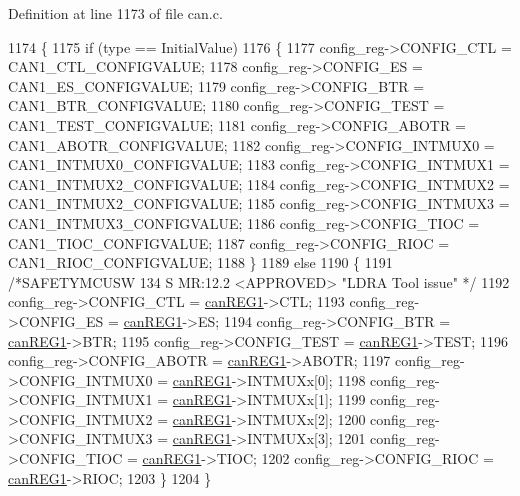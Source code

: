 Definition at line 1173 of file can.\+c.


\begin{DoxyCode}
1174 \{
1175     \textcolor{keywordflow}{if} (type == InitialValue)
1176     \{
1177         config\_reg->CONFIG\_CTL     = CAN1\_CTL\_CONFIGVALUE;    
1178         config\_reg->CONFIG\_ES      = CAN1\_ES\_CONFIGVALUE;     
1179         config\_reg->CONFIG\_BTR     = CAN1\_BTR\_CONFIGVALUE;    
1180         config\_reg->CONFIG\_TEST    = CAN1\_TEST\_CONFIGVALUE;   
1181         config\_reg->CONFIG\_ABOTR   = CAN1\_ABOTR\_CONFIGVALUE;  
1182         config\_reg->CONFIG\_INTMUX0 = CAN1\_INTMUX0\_CONFIGVALUE;
1183         config\_reg->CONFIG\_INTMUX1 = CAN1\_INTMUX2\_CONFIGVALUE;
1184         config\_reg->CONFIG\_INTMUX2 = CAN1\_INTMUX2\_CONFIGVALUE;
1185         config\_reg->CONFIG\_INTMUX3 = CAN1\_INTMUX3\_CONFIGVALUE;
1186         config\_reg->CONFIG\_TIOC    = CAN1\_TIOC\_CONFIGVALUE;   
1187         config\_reg->CONFIG\_RIOC    = CAN1\_RIOC\_CONFIGVALUE;    
1188     \}
1189     \textcolor{keywordflow}{else}
1190     \{
1191     \textcolor{comment}{/*SAFETYMCUSW 134 S MR:12.2 <APPROVED> "LDRA Tool issue" */}
1192         config\_reg->CONFIG\_CTL     = \mbox{\hyperlink{reg__can_8h_a7a0d043070590fc91cfa3c0e39379b19}{canREG1}}->CTL;   
1193         config\_reg->CONFIG\_ES      = \mbox{\hyperlink{reg__can_8h_a7a0d043070590fc91cfa3c0e39379b19}{canREG1}}->ES;     
1194         config\_reg->CONFIG\_BTR     = \mbox{\hyperlink{reg__can_8h_a7a0d043070590fc91cfa3c0e39379b19}{canREG1}}->BTR;    
1195         config\_reg->CONFIG\_TEST    = \mbox{\hyperlink{reg__can_8h_a7a0d043070590fc91cfa3c0e39379b19}{canREG1}}->TEST;   
1196         config\_reg->CONFIG\_ABOTR   = \mbox{\hyperlink{reg__can_8h_a7a0d043070590fc91cfa3c0e39379b19}{canREG1}}->ABOTR;  
1197         config\_reg->CONFIG\_INTMUX0 = \mbox{\hyperlink{reg__can_8h_a7a0d043070590fc91cfa3c0e39379b19}{canREG1}}->INTMUXx[0];
1198         config\_reg->CONFIG\_INTMUX1 = \mbox{\hyperlink{reg__can_8h_a7a0d043070590fc91cfa3c0e39379b19}{canREG1}}->INTMUXx[1];
1199         config\_reg->CONFIG\_INTMUX2 = \mbox{\hyperlink{reg__can_8h_a7a0d043070590fc91cfa3c0e39379b19}{canREG1}}->INTMUXx[2];
1200         config\_reg->CONFIG\_INTMUX3 = \mbox{\hyperlink{reg__can_8h_a7a0d043070590fc91cfa3c0e39379b19}{canREG1}}->INTMUXx[3];
1201         config\_reg->CONFIG\_TIOC    = \mbox{\hyperlink{reg__can_8h_a7a0d043070590fc91cfa3c0e39379b19}{canREG1}}->TIOC;
1202         config\_reg->CONFIG\_RIOC    = \mbox{\hyperlink{reg__can_8h_a7a0d043070590fc91cfa3c0e39379b19}{canREG1}}->RIOC;   
1203     \}
1204 \}
\end{DoxyCode}
\mbox{\label{group__CAN_gaaf364da9e334318c980ff42a40b4b11d}} 
